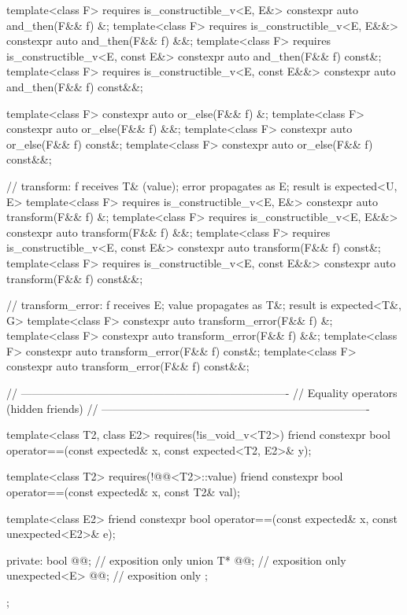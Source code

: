 \begin{codeblock}
{{    template<class F>
      requires is_constructible_v<E, E&>
    constexpr auto and_then(F&& f) &;
    template<class F>
      requires is_constructible_v<E, E&&>
    constexpr auto and_then(F&& f) &&;
    template<class F>
      requires is_constructible_v<E, const E&>
    constexpr auto and_then(F&& f) const&;
    template<class F>
      requires is_constructible_v<E, const E&&>
    constexpr auto and_then(F&& f) const&&;

    template<class F> constexpr auto or_else(F&& f) &;
    template<class F> constexpr auto or_else(F&& f) &&;
    template<class F> constexpr auto or_else(F&& f) const&;
    template<class F> constexpr auto or_else(F&& f) const&&;

    // transform: f receives T& (value); error propagates as E; result is expected<U, E>
    template<class F>
      requires is_constructible_v<E, E&>
    constexpr auto transform(F&& f) &;
    template<class F>
      requires is_constructible_v<E, E&&>
    constexpr auto transform(F&& f) &&;
    template<class F>
      requires is_constructible_v<E, const E&>
    constexpr auto transform(F&& f) const&;
    template<class F>
      requires is_constructible_v<E, const E&&>
    constexpr auto transform(F&& f) const&&;

    // transform_error: f receives E; value propagates as T&; result is expected<T&, G>
    template<class F> constexpr auto transform_error(F&& f) &;
    template<class F> constexpr auto transform_error(F&& f) &&;
    template<class F> constexpr auto transform_error(F&& f) const&;
    template<class F> constexpr auto transform_error(F&& f) const&&;

    // -------------------------------------------------------------------------
    // Equality operators (hidden friends)
    // -------------------------------------------------------------------------

    template<class T2, class E2>
      requires(!is_void_v<T2>)
    friend constexpr bool operator==(const expected& x, const expected<T2, E2>& y);

    template<class T2>
      requires(!@@<T2>::value)
    friend constexpr bool operator==(const expected& x, const T2& val);

    template<class E2>
    friend constexpr bool operator==(const expected& x, const unexpected<E2>& e);

  private:
    bool @@; // exposition only
    union {
      T* @@;             // exposition only
      unexpected<E> @@; // exposition only
    };
  };
}
\end{codeblock}


